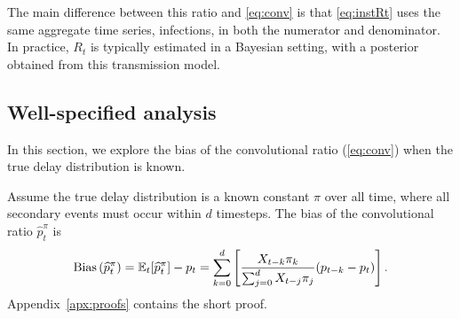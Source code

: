 \documentclass{article}
\renewcommand{\hat}{\widehat} %
\DeclareMathOperator{\bias}{Bias}
\newcommand{\djmcomment}[1]{{\color{teal}[DJM: #1]}}
\newcommand{\jmgcomment}[1]{{\color{cyan}[JMG: #1]}}
\begin{document}
The main difference between this ratio and \eqref{eq:conv} is that \eqref{eq:instRt} uses the same aggregate time series, infections, in both the numerator and denominator. In practice, $R_t$ is typically estimated in a Bayesian setting, with a posterior obtained from this transmission model. 

\subsection{Well-specified analysis}\label{sec:ws_analysis}

In this section, we explore the bias of the convolutional ratio (\ref{eq:conv}) when the true delay distribution is known.

\begin{proposition}\label{thm:OracleBias}
    Assume the true delay distribution is a known constant $\pi$ over all time, where all secondary events must occur within $d$ timesteps. 
    The bias of the convolutional ratio $\hat{p}_t^\pi$ is
\begin{equation*}
    \bias\left(\hat{p}_t^\pi\right) = \E_t[\hat{p}_t^\pi] - p_t = \sum_{k=0}^d \left[ \frac{X_{t-k}\pi_k}{\sum_{j=0}^d X_{t-j}\pi_j} (p_{t-k}-p_t) \right].
\end{equation*}
Appendix~\ref{apx:proofs} contains the short proof.
\end{proposition}
\end{document}

